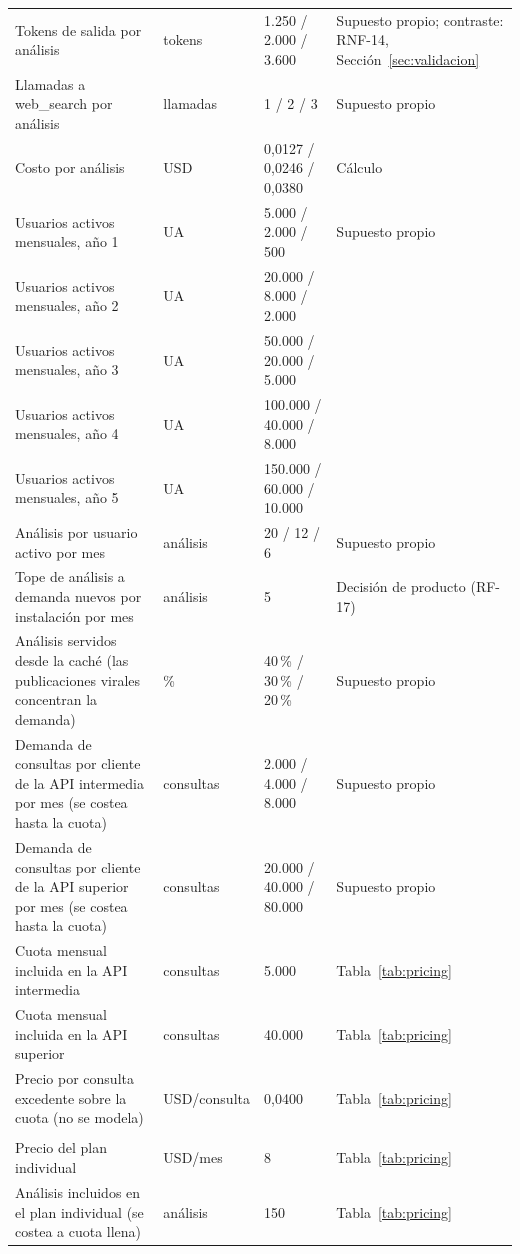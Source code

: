 {\begin{longtable}{@{}>{\raggedright\arraybackslash}p{5.2cm} p{2.1cm} p{2.4cm} >{\raggedright\arraybackslash}p{4.1cm}@{}}
    Tokens de salida por análisis & tokens & 1.250 / 2.000 / 3.600 & Supuesto propio; contraste: RNF-14, Sección~\ref{sec:validacion} \\
    Llamadas a web\_search por análisis & llamadas & 1 / 2 / 3 & Supuesto propio \\
    Costo por análisis & USD & 0,0127 / 0,0246 / 0,0380 & Cálculo \\
    Usuarios activos mensuales, año 1 & UA & 5.000 / 2.000 / 500 & Supuesto propio \\
    Usuarios activos mensuales, año 2 & UA & 20.000 / 8.000 / 2.000 &  \\
    Usuarios activos mensuales, año 3 & UA & 50.000 / 20.000 / 5.000 &  \\
    Usuarios activos mensuales, año 4 & UA & 100.000 / 40.000 / 8.000 &  \\
    Usuarios activos mensuales, año 5 & UA & 150.000 / 60.000 / 10.000 &  \\
    Análisis por usuario activo por mes & análisis & 20 / 12 / 6 & Supuesto propio \\
    Tope de análisis a demanda nuevos por instalación por mes & análisis & 5 & Decisión de producto (RF-17) \\
    Análisis servidos desde la caché (las publicaciones virales concentran la demanda) & \% & 40\,\% / 30\,\% / 20\,\% & Supuesto propio \\
    Demanda de consultas por cliente de la API intermedia por mes (se costea hasta la cuota) & consultas & 2.000 / 4.000 / 8.000 & Supuesto propio \\
    Demanda de consultas por cliente de la API superior por mes (se costea hasta la cuota) & consultas & 20.000 / 40.000 / 80.000 & Supuesto propio \\
    Cuota mensual incluida en la API intermedia & consultas & 5.000 & Tabla~\ref{tab:pricing} \\
    Cuota mensual incluida en la API superior & consultas & 40.000 & Tabla~\ref{tab:pricing} \\
    Precio por consulta excedente sobre la cuota (no se modela) & USD/consulta & 0,0400 & Tabla~\ref{tab:pricing} \\
    \multicolumn{4}{@{}l}{\textit{Plan individual pago}} \\
    Precio del plan individual & USD/mes & 8 & Tabla~\ref{tab:pricing} \\
    Análisis incluidos en el plan individual (se costea a cuota llena) & análisis & 150 & Tabla~\ref{tab:pricing} \\

\end{longtable}}
